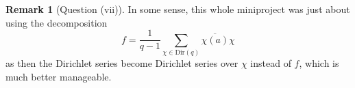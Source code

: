 \documentclass{scrartcl}
\theoremstyle{definition}
\newtheorem{remark}[definition]{Remark}
\begin{document}
\begin{remark}[Question (vii)]
    In some sense, this whole miniproject was just about using the decomposition
    \begin{equation*}
        f = \frac 1 {q - 1} \sum_{\chi \in \mathrm{Dir}(q)} \overline{\chi(a)} \chi
    \end{equation*}
    as then the Dirichlet series become Dirichlet series over $\chi$ instead of $f$, which is much better manageable.
\end{remark}

\printbibliography
\end{document}
